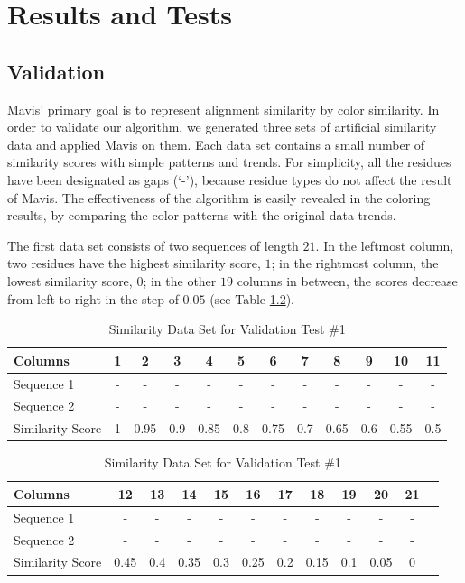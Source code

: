 \chapter{Results and Tests}\label{chap:Results}

\section{Validation}

Mavis' primary goal is to represent alignment similarity by color similarity. In order to validate our algorithm, we generated three sets of artificial similarity data and applied Mavis on them. Each data set contains a small number of similarity scores with simple patterns and trends. For simplicity, all the residues have been designated as gaps (`-'), because residue types do not affect the result of Mavis. The effectiveness of the algorithm is easily revealed in the coloring results, by comparing the color patterns with the original data trends.

The first data set consists of two sequences of length $21$. In the leftmost column, two residues have the highest similarity score, $1$; in the rightmost column, the lowest similarity score, $0$; in the other $19$ columns in between, the scores decrease from left to right in the step of $0.05$ (see Table \ref{tab:test_1}).

\begin{table}[htb]
\caption{Similarity Data Set for Validation Test \#1}\label{tab:test_1}\centering\small
\begin{tabular}{lccccccccccc} \toprule
  Columns           & 1   & 2    & 3   & 4    & 5   & 6    & 7   & 8    & 9   & 10   & 11  \\ \hline
  Sequence 1        & -   & -    & -   & -    & -   & -    & -   & -    & -   & -    & -   \\
  Sequence 2        & -   & -    & -   & -    & -   & -    & -   & -    & -   & -    & -   \\
  Similarity Score  & 1   & 0.95 & 0.9 & 0.85 & 0.8 & 0.75 & 0.7 & 0.65 & 0.6 & 0.55 & 0.5 \\ \bottomrule
\end{tabular}\vspace{4mm}
\begin{tabular}{lccccccccccc} \toprule
  Columns           & 12   & 13  & 14   & 15  & 16   & 17  & 18   & 19  & 20   & 21 \\ \hline
  Sequence 1        & -    & -   & -    & -   & -    & -   & -    & -   & -    & -  \\
  Sequence 2        & -    & -   & -    & -   & -    & -   & -    & -   & -    & -  \\
  Similarity Score  & 0.45 & 0.4 & 0.35 & 0.3 & 0.25 & 0.2 & 0.15 & 0.1 & 0.05 & 0  \\ \bottomrule
\end{tabular}
\end{table}

